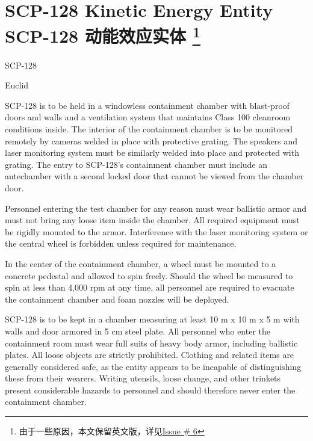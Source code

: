 \chapter[SCP-128 动能效应实体]{
    SCP-128 Kinetic Energy Entity\\
    SCP-128 动能效应实体
    \footnote{由于一些原因，本文保留英文版，详见\href{https://github.com/7sDream/scp-pdf/issues/6}{Issue \# 6}}
}

\label{chap:SCP-128}

 SCP-128

 Euclid

 SCP-128 is to be held in a windowless containment chamber with blast-proof doors and walls and a ventilation system that maintains Class 100 cleanroom conditions inside. The interior of the containment chamber is to be monitored remotely by cameras welded in place with protective grating. The speakers and laser monitoring system must be similarly welded into place and protected with grating. The entry to SCP-128's containment chamber must include an antechamber with a second locked door that cannot be viewed from the chamber door.

Personnel entering the test chamber for any reason must wear ballistic armor and must not bring any loose item inside the chamber. All required equipment must be rigidly mounted to the armor. Interference with the laser monitoring system or the central wheel is forbidden unless required for maintenance.

In the center of the containment chamber, a wheel must be mounted to a concrete pedestal and allowed to spin freely. Should the wheel be measured to spin at less than 4,000 rpm at any time, all personnel are required to evacuate the containment chamber and foam nozzles will be deployed.



SCP-128 is to be kept in a chamber measuring at least 10 m x 10 m x 5 m with walls and door armored in 5 cm steel plate. All personnel who enter the containment room must wear full suits of heavy body armor, including ballistic plates. All loose objects  are strictly prohibited. Clothing and related items are generally considered safe, as the entity appears to be incapable of distinguishing these from their wearers. Writing utensils, loose change, and other trinkets present considerable hazards to personnel and should therefore  never enter the containment chamber.

